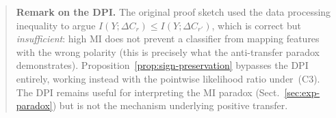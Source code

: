 \documentclass[runningheads]{llncs}
\begin{document}
\begin{quote}\small
\textbf{Remark on the DPI.}
The original proof sketch used the data processing inequality to argue
$I(Y;\Delta C_r) \leq I(Y;\Delta C_{r'})$, which is correct but
\emph{insufficient}: high MI does not prevent a classifier from mapping
features with the wrong polarity (this is precisely what the
anti-transfer paradox demonstrates).
Proposition~\ref{prop:sign-preservation} bypasses the DPI entirely,
working instead with the pointwise likelihood ratio under~(C3).
The DPI remains useful for interpreting the MI paradox
(Sect.~\ref{sec:exp-paradox}) but is not the mechanism underlying
positive transfer.
\end{quote}
\end{document}
